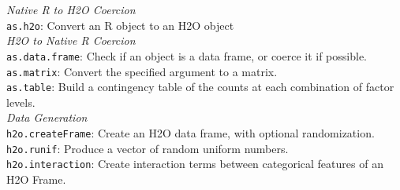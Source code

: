 \documentclass[11pt]{article}
\begin{document}
\noindent
{\emph{Native R to H2O Coercion}}\\
 {\texttt{as.h2o}}: Convert an R object to an H2O object\\

\noindent
\emph{H2O to Native R Coercion}\\
{\texttt{as.data.frame}}: Check if an object is a data frame, or coerce it if possible.\\
{\texttt{as.matrix}}: Convert the specified argument to a matrix.\\
 {\texttt{as.table}}: Build a contingency table of the counts at each combination of factor levels.\\

\emph{Data Generation}\\
{\texttt{h2o.createFrame}}: Create an H2O data frame, with optional randomization.\\
{\texttt{h2o.runif}}: Produce a vector of random uniform numbers.\\
{\texttt{h2o.interaction}}: Create interaction terms between categorical features of an H2O Frame.\\
\end{document}
